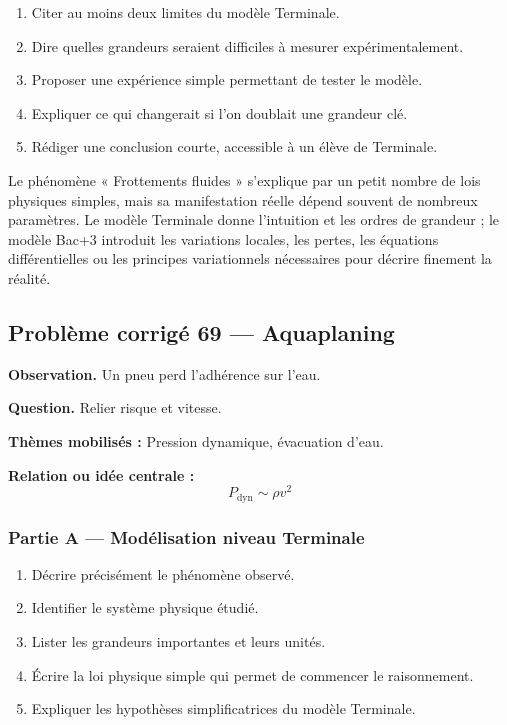 \documentclass[11pt,a4paper]{article}
\begin{document}
\begin{enumerate}
  \item Citer au moins deux limites du modèle Terminale.
  \item Dire quelles grandeurs seraient difficiles à mesurer expérimentalement.
  \item Proposer une expérience simple permettant de tester le modèle.
  \item Expliquer ce qui changerait si l'on doublait une grandeur clé.
  \item Rédiger une conclusion courte, accessible à un élève de Terminale.
\end{enumerate}

\begin{corrigebox}
Le phénomène « Frottements fluides » s'explique par un petit nombre de lois physiques simples, mais sa manifestation réelle dépend souvent de nombreux paramètres. Le modèle Terminale donne l'intuition et les ordres de grandeur ; le modèle Bac+3 introduit les variations locales, les pertes, les équations différentielles ou les principes variationnels nécessaires pour décrire finement la réalité.
\end{corrigebox}

\subsection{Problème corrigé 69 — Aquaplaning}

\begin{exercicebox}
\textbf{Observation.} Un pneu perd l'adhérence sur l'eau.

\medskip
\textbf{Question.} Relier risque et vitesse.

\medskip
\textbf{Thèmes mobilisés :} Pression dynamique, évacuation d'eau.

\medskip
\textbf{Relation ou idée centrale :}
\[
P_{\mathrm{dyn}}\sim\rho v^2
\]
\end{exercicebox}

\subsubsection*{Partie A — Modélisation niveau Terminale}

\begin{enumerate}
  \item Décrire précisément le phénomène observé.
  \item Identifier le système physique étudié.
  \item Lister les grandeurs importantes et leurs unités.
  \item Écrire la loi physique simple qui permet de commencer le raisonnement.
  \item Expliquer les hypothèses simplificatrices du modèle Terminale.
\end{enumerate}
\end{document}
